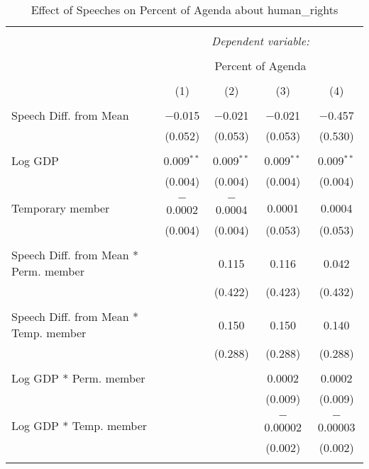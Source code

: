 
\begin{table}[!htbp] \centering 
  \caption{Effect of Speeches on Percent of Agenda about human_rights} 
  \label{} 
\begin{tabular}{@{\extracolsep{5pt}}lcccc} 
\\[-1.8ex]\hline 
\hline \\[-1.8ex] 
 & \multicolumn{4}{c}{\textit{Dependent variable:}} \\ 
\cline{2-5} 
\\[-1.8ex] & \multicolumn{4}{c}{Percent of Agenda} \\ 
\\[-1.8ex] & (1) & (2) & (3) & (4)\\ 
\hline \\[-1.8ex] 
 Speech Diff. from Mean & $-$0.015 & $-$0.021 & $-$0.021 & $-$0.457 \\ 
  & (0.052) & (0.053) & (0.053) & (0.530) \\ 
  & & & & \\ 
 Log GDP & 0.009$^{**}$ & 0.009$^{**}$ & 0.009$^{**}$ & 0.009$^{**}$ \\ 
  & (0.004) & (0.004) & (0.004) & (0.004) \\ 
  & & & & \\ 
 Temporary member & $-$0.0002 & $-$0.0004 & 0.0001 & 0.0004 \\ 
  & (0.004) & (0.004) & (0.053) & (0.053) \\ 
  & & & & \\ 
 Speech Diff. from Mean * Perm. member &  & 0.115 & 0.116 & 0.042 \\ 
  &  & (0.422) & (0.423) & (0.432) \\ 
  & & & & \\ 
 Speech Diff. from Mean * Temp. member &  & 0.150 & 0.150 & 0.140 \\ 
  &  & (0.288) & (0.288) & (0.288) \\ 
  & & & & \\ 
 Log GDP * Perm. member &  &  & 0.0002 & 0.0002 \\ 
  &  &  & (0.009) & (0.009) \\ 
  & & & & \\ 
 Log GDP * Temp. member &  &  & $-$0.00002 & $-$0.00003 \\ 
  &  &  & (0.002) & (0.002) \\ 
  & & & & \\ 

\end{tabular}
\end{table}
